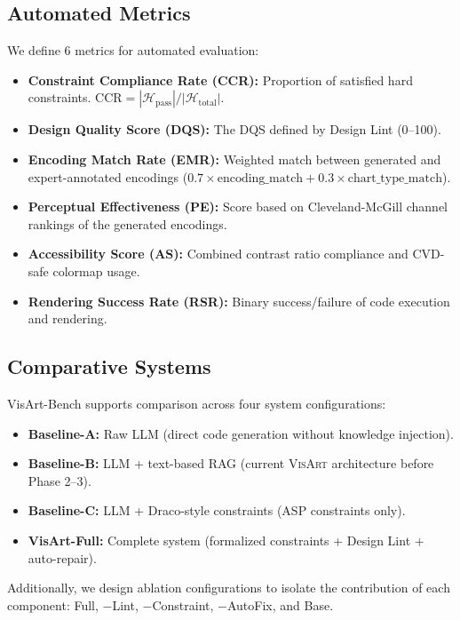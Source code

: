 \documentclass[journal]{vgtc}
\newcommand{\sysname}{\textsc{VisArt}}
\begin{document}
\subsection{Automated Metrics}

We define 6 metrics for automated evaluation:

\begin{itemize}
\item \textbf{Constraint Compliance Rate (CCR):} Proportion of satisfied hard constraints. $\text{CCR} = |\mathcal{H}_{\text{pass}}| / |\mathcal{H}_{\text{total}}|$.
\item \textbf{Design Quality Score (DQS):} The DQS defined by Design Lint (0--100).
\item \textbf{Encoding Match Rate (EMR):} Weighted match between generated and expert-annotated encodings ($0.7 \times \text{encoding\_match} + 0.3 \times \text{chart\_type\_match}$).
\item \textbf{Perceptual Effectiveness (PE):} Score based on Cleveland-McGill channel rankings of the generated encodings.
\item \textbf{Accessibility Score (AS):} Combined contrast ratio compliance and CVD-safe colormap usage.
\item \textbf{Rendering Success Rate (RSR):} Binary success/failure of code execution and rendering.
\end{itemize}

\subsection{Comparative Systems}

VisArt-Bench supports comparison across four system configurations:
\begin{itemize}
\item \textbf{Baseline-A:} Raw LLM (direct code generation without knowledge injection).
\item \textbf{Baseline-B:} LLM + text-based RAG (current \sysname{} architecture before Phase 2--3).
\item \textbf{Baseline-C:} LLM + Draco-style constraints (ASP constraints only).
\item \textbf{VisArt-Full:} Complete system (formalized constraints + Design Lint + auto-repair).
\end{itemize}

Additionally, we design ablation configurations to isolate the contribution of each component: Full, $-$Lint, $-$Constraint, $-$AutoFix, and Base.
\end{document}
